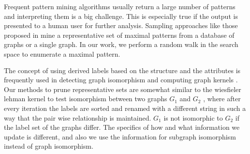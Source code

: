 Frequent pattern mining algorithms usually return a large number of
patterns and interpreting them is a big challenge. This is especially
true if the output is presented to a human user for further analysis.
Sampling approaches like those proposed in
\cite{2009-graphsampling,2011-icdm,RAM2008} mine a representative set of
maximal patterns from a database of graphs or a single graph. 
In our work, we perform a random walk in the search space
to enumerate a maximal pattern.

The concept of using derived labels based on the
structure and the attributes is frequently used in detecting graph
isomorphism \cite{zampelli} and computing graph kernels
\cite{shervashidzeJmlr,shervashidzeNips}. 
Our methods to prune representative sets are somewhat similar to
the wiesfieler lehman kernel to test isomorphism between two graphs
$G_1$ and $G_2$ \cite{weisfeiler}, where after every iteration the labels are
sorted and renamed with a different string in such a way that the pair
wise relationship is maintained. $G_1$ is not isomorphic to $G_2$ 
if the label set of the graphs differ. The specifics of how and what
information we update is different, and also we use the information for
subgraph isomorphism instead of graph isomorphism.

